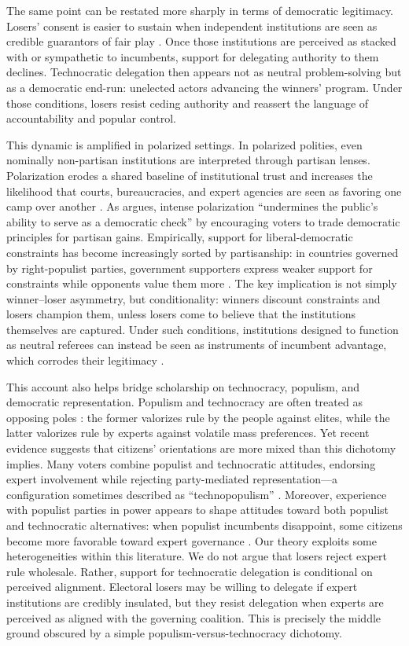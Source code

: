 \documentclass[11pt]{article}\usepackage[]{graphicx}\usepackage[]{xcolor}
\begin{document}
The same point can be restated more sharply in terms of democratic legitimacy. Losers' consent is easier to sustain when independent institutions are seen as credible guarantors of fair play \parencite{Anderson2005a}. Once those institutions are perceived as stacked with or sympathetic to incumbents, support for delegating authority to them declines. Technocratic delegation then appears not as neutral problem-solving but as a democratic end-run: unelected actors advancing the winners' program. Under those conditions, losers resist ceding authority and reassert the language of accountability and popular control.

This dynamic is amplified in polarized settings. In polarized polities, even nominally non-partisan institutions are interpreted through partisan lenses. Polarization erodes a shared baseline of institutional trust and increases the likelihood that courts, bureaucracies, and expert agencies are seen as favoring one camp over another \parencite{Paltra2025}. As \textcite{Svolik2019} argues, intense polarization ``undermines the public's ability to serve as a democratic check'' by encouraging voters to trade democratic principles for partisan gains. Empirically, support for liberal-democratic constraints has become increasingly sorted by partisanship: in countries governed by right-populist parties, government supporters express weaker support for constraints while opponents value them more \parencite{Claassen2025}. The key implication is not simply winner--loser asymmetry, but conditionality: winners discount constraints and losers champion them, unless losers come to believe that the institutions themselves are captured. Under such conditions, institutions designed to function as neutral referees can instead be seen as instruments of incumbent advantage, which corrodes their legitimacy \parencite[p.~471]{Lieberman2019}.

This account also helps bridge scholarship on technocracy, populism, and democratic representation. Populism and technocracy are often treated as opposing poles \parencite{Caramani2017}: the former valorizes rule by the people against elites, while the latter valorizes rule by experts against volatile mass preferences. Yet recent evidence suggests that citizens' orientations are more mixed than this dichotomy implies. Many voters combine populist and technocratic attitudes, endorsing expert involvement while rejecting party-mediated representation---a configuration sometimes described as ``technopopulism'' \parencite{Fernandez-Vazquez:2022}. Moreover, experience with populist parties in power appears to shape attitudes toward both populist and technocratic alternatives: when populist incumbents disappoint, some citizens become more favorable toward expert governance \parencite{VanderVeer2026}. Our theory exploits some heterogeneities within this literature. We do not argue that losers reject expert rule wholesale. Rather, support for technocratic delegation is conditional on perceived alignment. Electoral losers may be willing to delegate if expert institutions are credibly insulated, but they resist delegation when experts are perceived as aligned with the governing coalition. This is precisely the middle ground obscured by a simple populism-versus-technocracy dichotomy.
\end{document}
